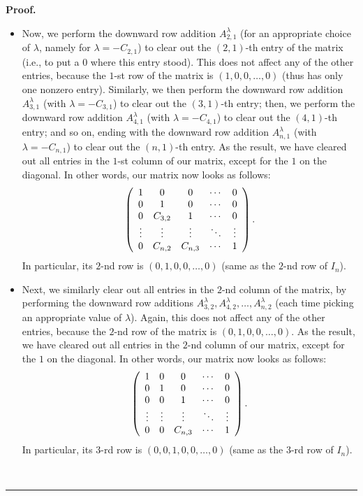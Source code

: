 \documentclass[numbers=enddot,12pt,final,onecolumn,notitlepage]{scrartcl}%
\theoremstyle{definition}
\newenvironment{proof}[1][Proof]{\noindent\textbf{#1.} }{\ \rule{0.5em}{0.5em}}
\begin{document}
\begin{proof}
\begin{itemize}
\item Now, we perform the downward row addition $A^{\lambda}_{2,1}$ (for an
appropriate choice of $\lambda$, namely for $\lambda= -C_{2,1}$) to clear out
the $\left(  2,1\right)  $-th entry of the matrix (i.e., to put a $0$ where
this entry stood). This does not affect any of the other entries, because the
$1$-st row of the matrix is $\left(  1,0,0,\ldots,0\right)  $ (thus has only
one nonzero entry). Similarly, we then perform the downward row addition
$A^{\lambda}_{3,1}$ (with $\lambda= -C_{3,1}$) to clear out the $\left(
3,1\right)  $-th entry; then, we perform the downward row addition
$A^{\lambda}_{4,1}$ (with $\lambda= -C_{4,1}$) to clear out the $\left(
4,1\right)  $-th entry; and so on, ending with the downward row addition
$A^{\lambda}_{n,1}$ (with $\lambda= -C_{n,1}$) to clear out the $\left(
n,1\right)  $-th entry. As the result, we have cleared out all entries in the
$1$-st column of our matrix, except for the $1$ on the diagonal. In other
words, our matrix now looks as follows:
\[
\left(
\begin{array}
[c]{ccccc}%
1 & 0 & 0 & \cdots & 0\\
0 & 1 & 0 & \cdots & 0\\
0 & C_{3,2} & 1 & \cdots & 0\\
\vdots & \vdots & \vdots & \ddots & \vdots\\
0 & C_{n,2} & C_{n,3} & \cdots & 1
\end{array}
\right)  .
\]
In particular, its $2$-nd row is $\left(  0,1,0,0,\ldots,0\right)  $ (same as
the $2$-nd row of $I_{n}$).

\item Next, we similarly clear out all entries in the $2$-nd column of the
matrix, by performing the downward row additions $A^{\lambda}_{3,2},
A^{\lambda}_{4,2}, \ldots, A^{\lambda}_{n,2}$ (each time picking an
appropriate value of $\lambda$). Again, this does not affect any of the other
entries, because the $2$-nd row of the matrix is $\left(  0,1,0,0,\ldots
,0\right)  $. As the result, we have cleared out all entries in the $2$-nd
column of our matrix, except for the $1$ on the diagonal. In other words, our
matrix now looks as follows:
\[
\left(
\begin{array}
[c]{ccccc}%
1 & 0 & 0 & \cdots & 0\\
0 & 1 & 0 & \cdots & 0\\
0 & 0 & 1 & \cdots & 0\\
\vdots & \vdots & \vdots & \ddots & \vdots\\
0 & 0 & C_{n,3} & \cdots & 1
\end{array}
\right)  .
\]
In particular, its $3$-rd row is $\left(  0,0,1,0,0,\ldots,0\right)  $ (same
as the $3$-rd row of $I_{n}$).


\end{itemize}
\end{proof}
\end{document}
